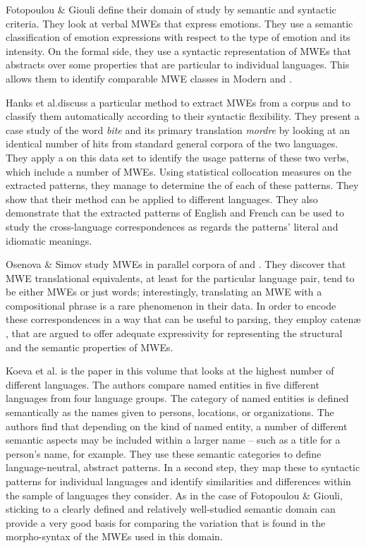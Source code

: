 \documentclass[output=paper]{langsci/langscibook}
\begin{document}
Fotopoulou \& Giouli define their domain of study by semantic and syntactic criteria. They look at verbal MWEs that express emotions. They use a semantic classification of emotion expressions with respect to the type of emotion and its intensity. On the formal side, they use a syntactic representation of MWEs that abstracts over some properties that are particular to individual languages. This allows them to identify comparable MWE classes in Modern  and .  

Hanks et al.\@ discuss a particular method to extract MWEs from a corpus and to classify them automatically according to their syntactic flexibility. They present a case study of the  word \textit{bite} and its primary  translation \textit{mordre} by looking at an identical number of hits from standard general corpora of the two languages. They apply a  on this data set to identify the usage patterns of these two verbs, which include a number of MWEs. Using statistical collocation measures on the extracted patterns, they manage to determine the  of each of these patterns. They show that their method can be applied to different languages. They also demonstrate that the extracted patterns of English and French can be used to study the cross-language correspondences as regards the patterns' literal and idiomatic meanings. 

Osenova \& Simov  study MWEs in parallel corpora of  and . They discover that MWE translational equivalents, at least for the particular language pair, tend to be either MWEs or just words; interestingly, translating an MWE with a compositional phrase is a rare phenomenon in their data. In order to encode these correspondences in a way that can be useful to parsing, they employ  caten\ae{} \citep{OGrady:98}, that are argued to offer adequate expressivity for representing the structural and the semantic properties of MWEs.

Koeva et al. is the paper in this volume that looks at the highest number of different languages. The authors compare named entities  in five different languages from four language groups. The category of named entities is defined semantically as the names given to persons, locations, or organizations. The authors find that depending on the kind of named entity, a number of different semantic aspects may be included within a larger name – such as a title for a person’s name, for example. They use these semantic categories to define language-neutral, abstract patterns. In a second step, they map these to syntactic patterns for individual languages and identify similarities and differences within the sample of languages they consider. As in the case of Fotopoulou \& Giouli, sticking to a clearly defined and relatively well-studied semantic domain can provide a very good basis for comparing the variation that is found in the morpho-syntax of the MWEs used in this domain.
\end{document}
